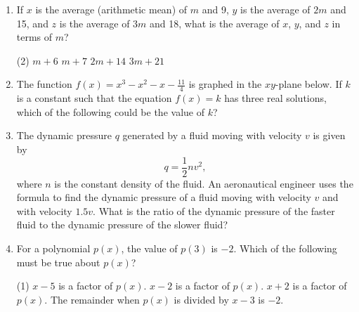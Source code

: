 \begin{enumerate}[leftmargin=*, label=\textbf{\arabic*.}, resume]
  \begin{tasks}(2)
  \end{tasks}
  \vspace{4cm}

  \newpage
  \item If $x$ is the average (arithmetic mean) of $m$ and 9, $y$ is the average of $2m$ and 15, and $z$ is the average of $3m$ and 18, what is the average of $x$, $y$, and $z$ in terms of $m$?

  \begin{tasks}(2)
    \task $m + 6$
    \task $m + 7$
    \task $2m + 14$
    \task $3m + 21$
  \end{tasks}
  \vspace{4cm}

  \item The function $f(x) = x^3 - x^2 - x - \frac{11}{4}$ is graphed in the $xy$-plane below. If $k$ is a constant such that the equation $f(x) = k$ has three real solutions, which of the following could be the value of $k$?
  \begin{center}
  \end{center}
  \vspace{4cm}


  \newpage
  \item The dynamic pressure $q$ generated by a fluid moving with velocity $v$ is given by
  \[
  q = \frac{1}{2} n v^2,
  \]
  where $n$ is the constant density of the fluid. An aeronautical engineer uses the formula to find the dynamic pressure of a fluid moving with velocity $v$ and with velocity $1.5v$. What is the ratio of the dynamic pressure of the faster fluid to the dynamic pressure of the slower fluid?
  \vspace{4cm}

  \item For a polynomial $p(x)$, the value of $p(3)$ is $-2$. Which of the following must be true about $p(x)$?

  \begin{tasks}(1)
    \task $x - 5$ is a factor of $p(x)$.
    \task $x - 2$ is a factor of $p(x)$.
    \task $x + 2$ is a factor of $p(x)$.
    \task The remainder when $p(x)$ is divided by $x - 3$ is $-2$.
  \end{tasks}
  \vspace{4cm}

\end{enumerate}
